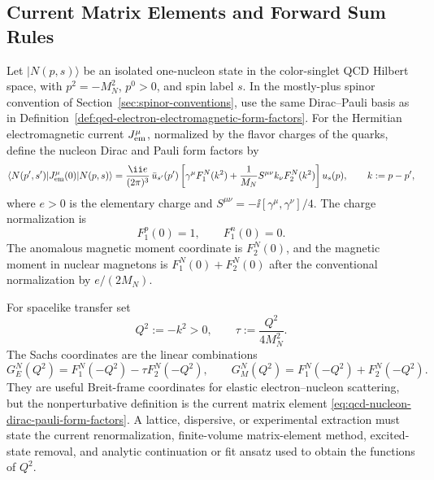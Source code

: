 \subsection{Current Matrix Elements and Forward Sum Rules}
\label{subsec:qcd-current-matrix-elements-forward-sum-rules}

\begin{definition}
\label{def:qcd-nucleon-current-matrix-elements}
Let \(|N(p,s)\rangle\) be an isolated one-nucleon state in the color-singlet
QCD Hilbert space, with \(p^2=-M_N^2\), \(p^0>0\), and spin label \(s\).  In
the mostly-plus spinor convention of Section~\ref{sec:spinor-conventions},
use the same Dirac--Pauli basis as in
Definition~\ref{def:qed-electron-electromagnetic-form-factors}.  For the Hermitian
electromagnetic current \(J_{\rm em}^\mu\), normalized by the flavor charges
of the quarks, define the nucleon Dirac and Pauli form factors by
\begin{equation}
  \langle N(p',s')|J_{\rm em}^\mu(0)|N(p,s)\rangle
  =
  \frac{\ii e}{(2\pi)^3}\,
  \bar u_{s'}(p')
  \left[
    \gamma^\mu F_1^N(k^2)
    +
    \frac1{M_N}S^{\mu\nu}k_\nu F_2^N(k^2)
  \right]
  u_s(p),
  \qquad k:=p-p',
  \label{eq:qcd-nucleon-dirac-pauli-form-factors}
\end{equation}
where \(e>0\) is the elementary charge and
\(S^{\mu\nu}=-\ii[\gamma^\mu,\gamma^\nu]/4\).  The charge normalization is
\[
  F_1^p(0)=1,\qquad F_1^n(0)=0.
\]
The anomalous magnetic moment coordinate is \(F_2^N(0)\), and the magnetic
moment in nuclear magnetons is \(F_1^N(0)+F_2^N(0)\) after the conventional
normalization by \(e/(2M_N)\).

For spacelike transfer set
\[
  Q^2:=-k^2>0,\qquad
  \tau:=\frac{Q^2}{4M_N^2}.
\]
The Sachs coordinates are the linear combinations
\begin{equation}
  G_E^N(Q^2)=F_1^N(-Q^2)-\tau F_2^N(-Q^2),
  \qquad
  G_M^N(Q^2)=F_1^N(-Q^2)+F_2^N(-Q^2).
  \label{eq:qcd-nucleon-sachs-form-factors}
\end{equation}
They are useful Breit-frame coordinates for elastic electron--nucleon
scattering, but the nonperturbative definition is the current matrix element
\eqref{eq:qcd-nucleon-dirac-pauli-form-factors}.  A lattice, dispersive, or
experimental extraction must state the current renormalization, finite-volume
matrix-element method, excited-state removal, and analytic continuation or
fit ansatz used to obtain the functions of \(Q^2\).
\end{definition}

